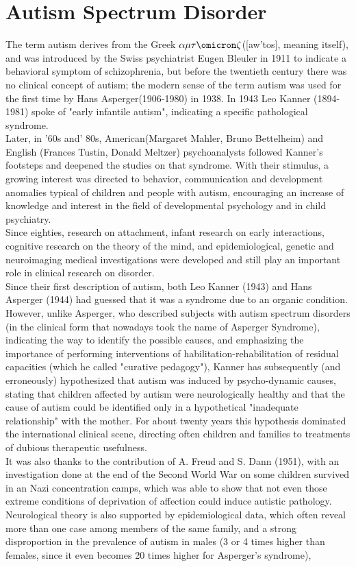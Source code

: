 \section{Autism Spectrum Disorder}
The term autism derives from the Greek $\alpha\mu\tau\omicron\zeta$([aw'tos], meaning itself), and was introduced by the Swiss psychiatrist Eugen Bleuler in 1911 to indicate a behavioral symptom of schizophrenia, but before the twentieth century there was no clinical concept of autism; the modern sense of the term autism was used for the first time by Hans Asperger(1906-1980) in 1938. In 1943 Leo Kanner (1894-1981) spoke of "early infantile autism", indicating a specific pathological syndrome.\\
Later, in '60s and' 80s, American(Margaret Mahler, Bruno Bettelheim) and English (Frances Tustin, Donald Meltzer) psychoanalysts followed Kanner's footsteps and deepened the studies on that syndrome. With their stimulus, a growing interest was directed to behavior, communication and development anomalies typical of children and people with autism, encouraging an increase of knowledge and interest in the field of developmental psychology and in child psychiatry.\\
Since eighties, research on attachment, infant research on early interactions, cognitive research on the theory of the mind, and epidemiological, genetic and neuroimaging medical investigations were developed and still play an important role in clinical research on disorder.\\
Since their first description of autism, both Leo Kanner (1943) and Hans Asperger (1944) had guessed that it was a syndrome due to an organic condition. However, unlike Asperger, who described subjects with autism spectrum disorders (in the clinical form that nowadays took the name of Asperger Syndrome), indicating the way to identify the possible causes, and emphasizing the importance of performing interventions of habilitation-rehabilitation of residual capacities (which he called "curative pedagogy"), Kanner has subsequently (and erroneously) hypothesized that autism was induced by psycho-dynamic causes, stating that children affected by autism were neurologically healthy and that the cause of autism could be identified only in a hypothetical "inadequate relationship" with the mother. For about twenty years this hypothesis dominated the international clinical scene, directing often children and families to treatments of dubious therapeutic usefulness.\\
It was also thanks to the contribution of A. Freud and S. Dann (1951), with an investigation done at the end of the Second World War on some children survived in an Nazi concentration camps, which was able to show that not even those extreme conditions of deprivation of affection could induce autistic pathology. Neurological theory is also supported by epidemiological data, which often reveal more than one case among members of the same family, and a strong disproportion in the prevalence of autism in males (3 or 4 times higher than females, since it even becomes 20 times higher for Asperger's syndrome),
